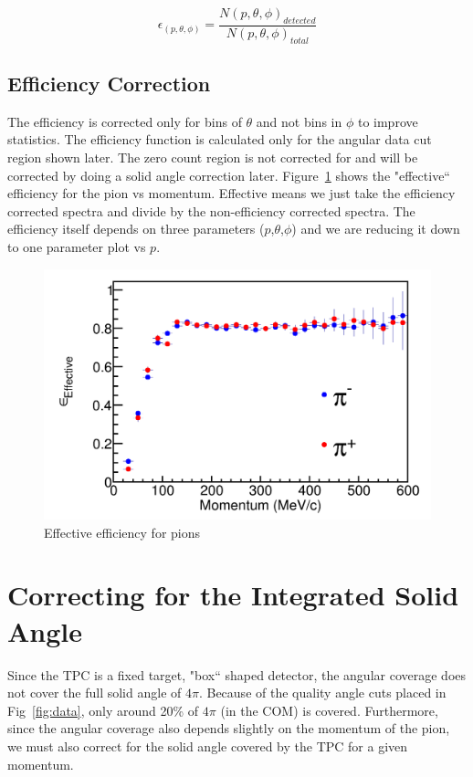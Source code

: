 \documentclass[12pt, letterpaper, twoside]{article}
\begin{document}
 \begin{equation} 
 \label{eq:eff_cal}
 \epsilon_{(p,\theta,\phi)} = \frac{N(p,\theta,\phi)_{detected}}{N(p,\theta,\phi)_{total}}
 \end{equation}  
  
  \subsection{Efficiency Correction}
The efficiency is corrected only for bins of $\theta$ and not bins in $\phi$ to improve statistics. The efficiency function is calculated only for the angular data cut region shown later. The zero count region is not corrected for and will be corrected by doing a solid angle correction later. Figure~\ref{fig:eff} shows the "effective`` efficiency for the pion vs momentum. Effective means we just take the efficiency corrected spectra and divide by the non-efficiency corrected spectra. The efficiency itself depends on  three parameters ($p$,$\theta$,$\phi$) and we are reducing it down to one parameter plot vs $p$. 

\begin{figure}
\includegraphics[width=\textwidth]{effEff.png}
 \caption{Effective efficiency for pions}
 \label{fig:eff}
\end{figure}
 
 
 \section{Correcting for the Integrated Solid Angle}
 Since the TPC is a fixed target, "box`` shaped detector, the angular coverage does not cover the full solid angle of $4\pi$. Because of the quality angle cuts placed in Fig~\ref{fig:data}, only around 20\% of $4\pi$ (in the COM) is covered. Furthermore, since the angular coverage also depends slightly on the momentum of the pion, we must also correct for the solid angle covered by the TPC for a given momentum. 
 
\end{document}
